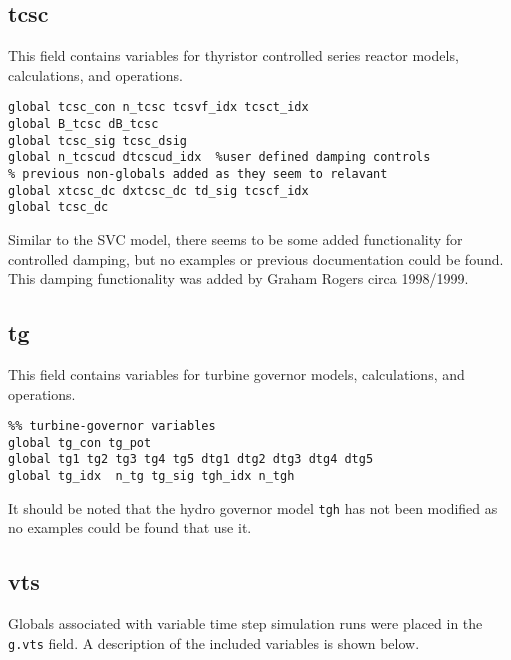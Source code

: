 \subsection{tcsc}
This field contains variables for thyristor controlled series reactor models, calculations, and operations.
\begin{verbatim}
global tcsc_con n_tcsc tcsvf_idx tcsct_idx
global B_tcsc dB_tcsc
global tcsc_sig tcsc_dsig
global n_tcscud dtcscud_idx  %user defined damping controls
% previous non-globals added as they seem to relavant
global xtcsc_dc dxtcsc_dc td_sig tcscf_idx 
global tcsc_dc
\end{verbatim}

Similar to the SVC model, there seems to be some added functionality for controlled damping, but no examples or previous documentation could be found.
This damping functionality was added by Graham Rogers circa 1998/1999.

\subsection{tg}
This field contains variables for turbine governor models, calculations, and operations.
\begin{verbatim}
%% turbine-governor variables
global tg_con tg_pot
global tg1 tg2 tg3 tg4 tg5 dtg1 dtg2 dtg3 dtg4 dtg5
global tg_idx  n_tg tg_sig tgh_idx n_tgh
\end{verbatim}

It should be noted that the hydro governor model \verb|tgh| has not been modified as no examples could be found that use it.

\subsection{vts}  
Globals associated with variable time step simulation runs were placed in the \verb|g.vts| field.
A description of the included variables is shown below.


